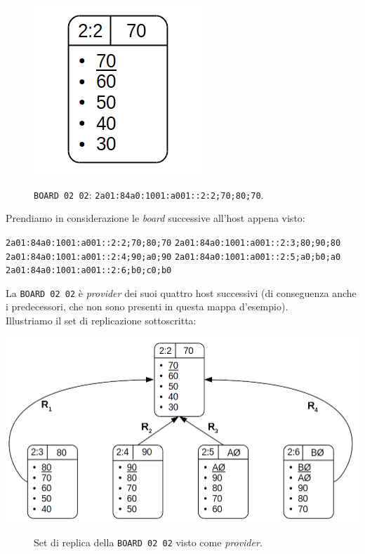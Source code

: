 \begin{figure}[htbp]
\centering
\includegraphics[scale=0.70]{img/focus_provider.png}\\
\caption{\verb"BOARD 02 02": \verb"2a01:84a0:1001:a001::2:2;70;80;70". \label{figura1.16}}
\end{figure}

Prendiamo in considerazione le \textit{board} successive all'host appena visto:

\begin{center}
\verb"2a01:84a0:1001:a001::2:2;70;80;70"
\verb"2a01:84a0:1001:a001::2:3;80;90;80"
\verb"2a01:84a0:1001:a001::2:4;90;a0;90"
\verb"2a01:84a0:1001:a001::2:5;a0;b0;a0"
\verb"2a01:84a0:1001:a001::2:6;b0;c0;b0"
\end{center}

La \verb"BOARD 02 02" \`{e} \textit{provider} dei suoi quattro host successivi (di conseguenza anche i predecessori, che non sono presenti in questa mappa d'esempio). \\
Illustriamo il set di replicazione sottoscritta:

\begin{center}
\includegraphics[scale=0.50]{img/prov_replica.png}
\end{center}
\begin{figure}[htbp]
\caption{Set di replica della \verb"BOARD 02 02" visto come \textit{provider}. \label{figura1.17}}
\end{figure}

